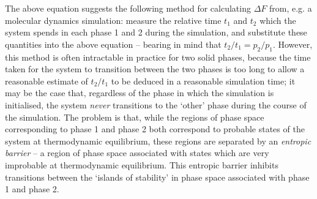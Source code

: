\documentclass{report}
\begin{document}
The above equation suggests the following method for calculating $\Delta F$ from, e.g. a molecular dynamics simulation: measure the relative time $t_1$ 
and $t_2$ which the system spends in each phase 1 and 2 during the simulation, and substitute these quantities into the above equation -- bearing in mind 
that $t_2/t_1=p_2/p_1$. However, this method is often intractable in practice for two solid phases, 
because the time taken for the system to transition between the two phases is too long to allow a reasonable estimate of $t_2/t_1$ to be deduced 
in a reasonable simulation time; it may be the case that, regardless of the phase in which the simulation is initialised, the system \emph{never} 
transitions to the `other' phase during the course of the simulation.
The problem is that, while the regions of phase space corresponding to phase 1 and phase 2 both correspond to probable states of the system
at thermodynamic equilibrium, these regions are separated by an \emph{entropic barrier} -- a region of phase space associated
with states which are very improbable at thermodynamic equilibrium. This entropic barrier inhibits transitions between the `islands of
stability' in phase space associated with phase 1 and phase 2.
\end{document}
